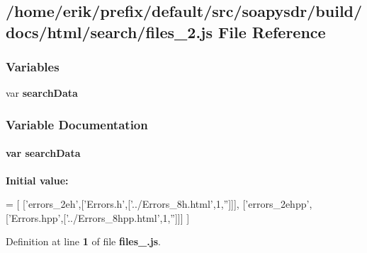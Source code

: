 \subsection{/home/erik/prefix/default/src/soapysdr/build/docs/html/search/files\+\_\+2.js File Reference}
\label{files__2_8js}
\subsubsection*{Variables}
\begin{DoxyCompactItemize}
\item 
var {\bf search\+Data}
\end{DoxyCompactItemize}


\subsubsection{Variable Documentation}
\paragraph[{search\+Data}]{\setlength{\rightskip}{0pt plus 5cm}var search\+Data}\label{files__2_8js_ad01a7523f103d6242ef9b0451861231e}
{\bfseries Initial value\+:}
\begin{DoxyCode}
=
[
  [\textcolor{stringliteral}{'errors\_2eh'},[\textcolor{stringliteral}{'Errors.h'},[\textcolor{stringliteral}{'../Errors\_8h.html'},1,\textcolor{stringliteral}{''}]]],
  [\textcolor{stringliteral}{'errors\_2ehpp'},[\textcolor{stringliteral}{'Errors.hpp'},[\textcolor{stringliteral}{'../Errors\_8hpp.html'},1,\textcolor{stringliteral}{''}]]]
]
\end{DoxyCode}


Definition at line {\bf 1} of file {\bf files\+\_.\+js}.

